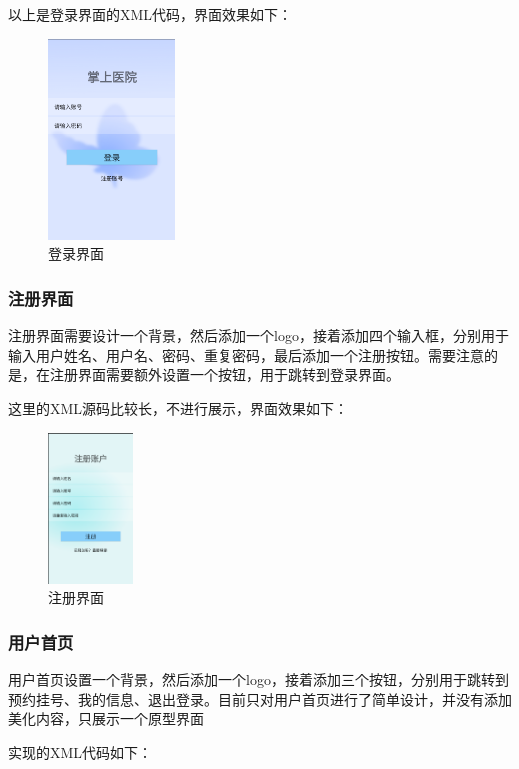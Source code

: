\documentclass[UTF8,12pt]{article}
\begin{document}
以上是登录界面的XML代码，界面效果如下：

\begin{figure}[htbp]
    \centering
    \includegraphics[width=0.3\textwidth]{imgs/11.png}
    \caption{登录界面}
\end{figure}

\subsubsection{注册界面}
注册界面需要设计一个背景，然后添加一个logo，接着添加四个输入框，分别用于输入用户姓名、用户名、密码、重复密码，最后添加一个注册按钮。需要注意的是，在注册界面需要额外设置一个按钮，用于跳转到登录界面。

这里的XML源码比较长，不进行展示，界面效果如下：

\begin{figure}[htbp]
    \centering
    \includegraphics[width=0.2\textwidth]{imgs/12.png}
    \caption{注册界面}
\end{figure}

\subsubsection{用户首页}
用户首页设置一个背景，然后添加一个logo，接着添加三个按钮，分别用于跳转到预约挂号、我的信息、退出登录。目前只对用户首页进行了简单设计，并没有添加美化内容，只展示一个原型界面

实现的XML代码如下：
\end{document}
